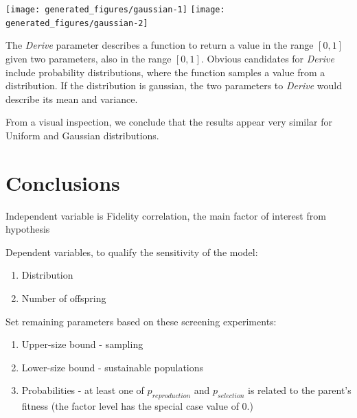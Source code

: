 \begin{knitrout}
\color{fgcolor}
\texttt{[image: generated\_figures/gaussian-1]} 
\texttt{[image: generated\_figures/gaussian-2]} 

\end{knitrout}

The \emph{Derive} parameter describes a function to return a value in the range $[0,1]$ given two parameters, also in the range $[0,1]$. Obvious candidates for \emph{Derive} include probability distributions, where the function samples a value from a distribution. If the distribution is gaussian, the two parameters to \emph{Derive} would describe its mean and variance.  

From a visual inspection, we conclude that the results appear very similar for Uniform and Gaussian distributions.

\section{Conclusions}

Independent variable is Fidelity correlation, the main factor of interest from hypothesis

Dependent variables, to qualify the sensitivity of the model:
\begin{enumerate}
	\item Distribution
	\item Number of offspring
\end{enumerate}

Set remaining parameters based on these screening experiments:
\begin{enumerate}
	\item Upper-size bound - sampling %
	\item Lower-size bound - sustainable populations %
	\item Probabilities - at least one of $p_{reproduction}$ and $p_{selection}$ is related to the parent's fitness (\ie the factor level has the special case value of 0.) %
	      	
	      	
\end{enumerate}

